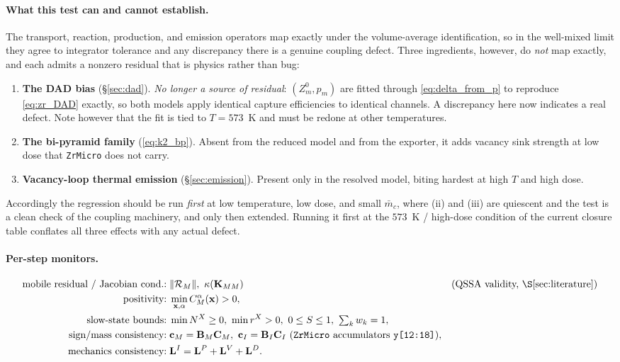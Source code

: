 \documentclass[11pt]{article}
\newcommand{\CM}{\mathbf{C}_{M}}
\newcommand{\cM}{\mathbf{c}_{M}}
\newcommand{\CI}{\mathbf{C}_{I}}
\newcommand{\cI}{\mathbf{c}_{I}}
\newcommand{\BM}{\mathbf{B}_{M}}
\newcommand{\BI}{\mathbf{B}_{I}}
\newcommand{\ZrMicro}{\texttt{ZrMicro}}
\begin{document}
\paragraph{What this test can and cannot establish.}
The transport, reaction, production, and emission operators map exactly under the
volume-average identification, so in the well-mixed limit they agree to
integrator tolerance and any discrepancy there is a genuine coupling defect.
Three ingredients, however, do \emph{not} map exactly, and each admits a nonzero
residual that is physics rather than bug:
\begin{enumerate}[leftmargin=1.6em]
\item \textbf{The DAD bias} (\S\ref{sec:dad}). \emph{No longer a source of
residual}: $(Z^0_m,p_m)$ are fitted through \eqref{eq:delta_from_p} to reproduce
\eqref{eq:zr_DAD} exactly, so both models apply identical capture efficiencies to
identical channels. A discrepancy here now indicates a real defect. Note however
that the fit is tied to $T=573$~K and must be redone at other temperatures.
\item \textbf{The bi-pyramid family} (\eqref{eq:k2_bp}). Absent from the reduced
model and from the exporter, it adds vacancy sink strength at low dose that
\ZrMicro{} does not carry.
\item \textbf{Vacancy-loop thermal emission} (\S\ref{sec:emission}). Present only
in the resolved model, biting hardest at high $T$ and high dose.
\end{enumerate}
Accordingly the regression should be run \emph{first} at low temperature, low
dose, and small $\bar m_c$, where (ii) and (iii) are quiescent and the test is a
clean check of the coupling machinery, and only then extended. Running it first
at the $573$~K / high-dose condition of the current closure table conflates all
three effects with any actual defect.

\paragraph{Per-step monitors.}
\begin{align}
    \text{mobile residual / Jacobian cond.:}\;&\|\mathcal R_M\|,\ \kappa(\mathbf K_{MM})
        &&\text{(QSSA validity, \S\ref{sec:literature})}\\
    \text{positivity:}\;&\min_{\mathbf x,\alpha}C_M^\alpha(\mathbf x)>0,\\
    \text{slow-state bounds:}\;&\min N^{X}\ge0,\ \min r^{X}>0,\ 0\le S\le1,\ \textstyle\sum_k w_k=1,\\
    \text{sign/mass consistency:}\;&\cM=\BM\CM,\ \cI=\BI\CI\ \text{(\ZrMicro{} accumulators \texttt{y[12:18]})},\\
    \text{mechanics consistency:}\;&\mathbf L^I=\mathbf L^P+\mathbf L^V+\mathbf L^D.
\end{align}
\end{document}
